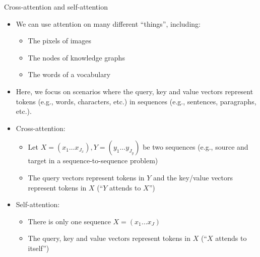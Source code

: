 \begin{vbframe}{Cross-attention and self-attention}

\vskip-3mm
\vfill

\begin{itemize}
	\item We can use attention on many different ``things'', including: 
		\begin{itemize}
			\item The pixels of images
			\item The nodes of knowledge graphs
			\item The words of a vocabulary
		\end{itemize}
	\item Here, we focus on scenarios where the query, key and value vectors represent tokens (e.g., words, characters, etc.) in sequences (e.g., sentences, paragraphs, etc.).
	\item Cross-attention:
		\begin{itemize}
			\item Let $X = (x_1 \ldots x_{J_x}), Y = (y_1 \ldots y_{J_y})$ be two sequences (e.g., source and target in a sequence-to-sequence problem)
			\item The query vectors represent tokens in $Y$ and the key/value vectors represent tokens in $X$ (``$Y$ attends to $X$'')
		\end{itemize}
	\item Self-attention:
		\begin{itemize}
			\item There is only one sequence $X = (x_1 \ldots x_J)$
			\item The query, key and value vectors represent tokens in $X$ (``$X$ attends to itself'')
		\end{itemize}
\end{itemize}

\vfill

\end{vbframe}


